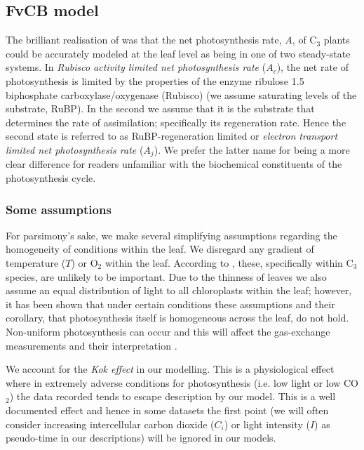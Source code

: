 \documentclass[11pt]{article} %
\begin{document}
\subsection{FvCB model}
The brilliant realisation of \citet{Farquharbiochemicalmodelphotosynthetic1980} was that the net photosynthesis rate, $A$, of C$_3$ plants could be accurately modeled at the leaf level as being in one of two steady-state systems. In \emph{Rubisco activity limited net photosynthesis rate} ($A_c$), the net rate of photosynthesis is limited by the properties of the enzyme ribulose 1.5 biphosphate carboxylase/oxygenase (Rubisco) (we assume saturating levels of the substrate, RuBP). In the second we assume that it is the substrate that determines the rate of assimilation; specifically its regeneration rate. Hence the second state is referred to as RuBP-regeneration limited or \emph{electron transport limited net photosynthesis rate} ($A_j$)\cite{YinUsingcombinedmeasurements2009}. We prefer the latter name for being a more clear difference for readers unfamiliar with the biochemical constituents of the photosynthesis cycle.

\subsubsection{Some assumptions} \label{Assumptions}
For parsimony's sake, we make several simplifying assumptions regarding the homogeneity of conditions within the leaf. We disregard any gradient of temperature ($T$) or O$_2$ within the leaf. According to \citet{CaemmererBiochemicalmodelsleaf2000}, these, specifically within C$_3$ species, are unlikely to be important. Due to the thinness of leaves we also assume an equal distribution of light to all chloroplasts within the leaf; however, it has been shown that under certain conditions these assumptions and their corollary, that photosynthesis itself is homogeneous across the leaf, do not hold. Non-uniform photosynthesis can occur and this will affect the gas-exchange measurements and their interpretation \cite{TerashimaAnatomynonuniformleaf1992}.

We account for the \emph{Kok effect} in our modelling. This is a physiological effect where in extremely adverse conditions for photosynthesis (i.e. low light or low CO$_2$) the data recorded tends to escape description by our model. This is a well documented effect and hence in some datasets the first point (we will often consider increasing intercellular carbon dioxide ($C_i$) or light intensity ($I$) as pseudo-time in our descriptions) will be ignored in our models.
\end{document}

